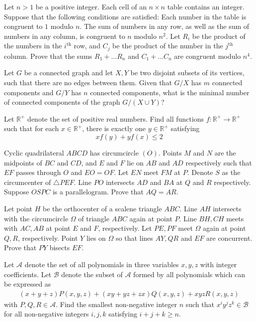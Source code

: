 \documentclass[11pt]{scrartcl}
\begin{document}
\begin{problem}[1248852037865425410]
Let $n>1$ be a positive integer. Each cell of an $n\times n$ table contains an integer. Suppose that the following conditions are satisfied:
Each number in the table is congruent to $1$ modulo $n$.
The sum of numbers in any row, as well as the sum of numbers in any column, is congruent to $n$ modulo $n^2$.
Let $R_i$ be the product of the numbers in the $i^{\text{th}}$ row, and $C_j$ be the product of the number in the $j^{\text{th}}$ column. Prove that the sums $R_1+\hdots R_n$ and $C_1+\hdots C_n$ are congruent modulo $n^4$.
\end{problem}
\begin{problem}[8612979541975584705]
	Let $G$ be a connected graph and let $X, Y$ be two disjoint subsets of its vertices, such that there are no edges between them. Given that $G/X$ has $m$ connected components and $G/Y$ has $n$ connected components, what is the minimal number of connected components of the graph $G/(X \cup Y)$?
\end{problem}
\begin{problem}[6558910862034852540]
Let $\mathbb{R}^+$ denote the set of positive real numbers. Find all functions $f: \mathbb{R}^+ \to \mathbb{R}^+$ such that for each $x \in \mathbb{R}^+$, there is exactly one $y \in \mathbb{R}^+$ satisfying$$xf(y)+yf(x) \leq 2$$
\end{problem}
\begin{problem}[6612845742708555351]
	Cyclic quadrilateral $ABCD$ has circumcircle $(O)$. Points $M$ and $N$ are the midpoints of $BC$ and $CD$, and $E$ and $F$ lie on $AB$ and $AD$ respectively such that $EF$ passes through $O$ and $EO=OF$. Let $EN$ meet $FM$ at $P$. Denote $S$ as the circumcenter of $\triangle PEF$. Line $PO$ intersects $AD$ and $BA$ at $Q$ and $R$ respectively. Suppose $OSPC$ is a parallelogram. Prove that $AQ=AR$.
\end{problem}
\begin{problem}[844684477828422]
Let point $H$ be the orthocenter of a scalene triangle $ABC$. Line $AH$ intersects with the circumcircle $\Omega$ of triangle $ABC$ again at point $P$. Line $BH, CH$ meets with $AC,AB$ at point $E$ and $F$, respectively. Let $PE, PF$ meet $\Omega$ again at point $Q,R$, respectively. Point $Y$ lies on $\Omega$ so that lines $AY,QR$ and $EF$ are concurrent. Prove that $PY$ bisects $EF$.
\end{problem}
\begin{problem}[712971117639738]
Let $\mathcal{A}$ denote the set of all polynomials in three variables $x, y, z$ with integer coefficients. Let $\mathcal{B}$ denote the subset of $\mathcal{A}$ formed by all polynomials which can be expressed as
\begin{align*}
(x + y + z)P(x, y, z) + (xy + yz + zx)Q(x, y, z) + xyzR(x, y, z)
\end{align*}with $P, Q, R \in \mathcal{A}$. Find the smallest non-negative integer $n$ such that $x^i y^j z^k \in \mathcal{B}$ for all non-negative integers $i, j, k$ satisfying $i + j + k \geq n$.
\end{problem}
\end{document}

